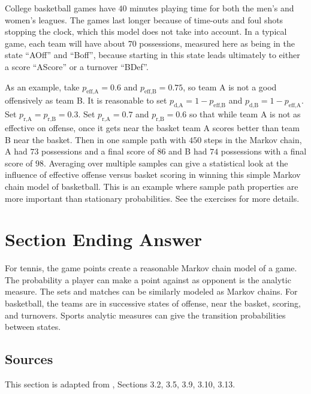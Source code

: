 \documentclass[12pt]{article}
\begin{document}
College basketball games have \( 40 \) minutes playing time for both the
men's and women's leagues.  The games last longer because of time-outs
and foul shots stopping the clock, which this model does not take into
account.  In a typical game, each team will have about \( 70 \)
possessions, measured here as being in the state ``AOff'' and ``Boff'',
because starting in this state leads ultimately to either a score
``AScore'' or a turnover ``BDef''.

As an example, take \( p_{\text{eff,A}} = 0.6 \) and \( p_{\text{eff,B}}
= 0.75 \), so team A is not a good offensively as team B. It is
reasonable to set \( p_{\text{d,A}} = 1 - p_{\text{eff,B}} \) and \( p_{\text
{d,B}} = 1 - p_{\text{eff,A}} \).  Set \( p_{\text{r,A}} = p_{\text{r,B}}
= 0.3 \).  Set \( p_{\text{r,A}} = 0.7 \) and \( p_{\text{r,B}} = 0.6 \)
so that while team A is not as effective on offense, once it gets near
the basket team A scores better than team B near the basket.  Then in
one sample path with \( 450 \) steps in the Markov chain, A had \( 73 \)
possessions and a final score of \( 86 \) and B had \( 74 \) possessions
with a final score of \( 98 \).  Averaging over multiple samples can
give a statistical look at the influence of effective offense versus
basket scoring in winning this simple Markov chain model of basketball.
This is an example where sample path properties are more important than
stationary probabilities.  See the exercises for more details.

\section*{Section Ending Answer} For tennis, the game points create a
reasonable Markov chain model of a game.  The probability a player can
make a point against as opponent is the analytic measure.  The sets and
matches can be similarly modeled as Markov chains.  For basketball, the
teams are in successive states of offense, near the basket, scoring, and
turnovers.  Sports analytic measures can give the transition
probabilities between states.

\subsection*{Sources} This section is adapted from
\cite{sadovskii93}, Sections 3.2, 3.5, 3.9, 3.10, 3.13.

\hr
\end{document}
